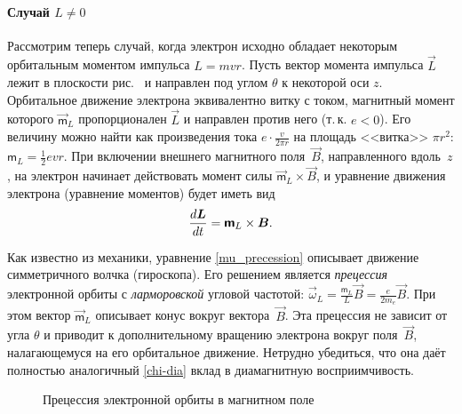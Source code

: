 \paragraph{Случай $L\ne0$}

Рассмотрим теперь случай, когда электрон исходно обладает некоторым
орбитальным моментом импульса $L=mvr$. 
Пусть вектор момента импульса $\vec{L}$ лежит в плоскости
рис.~ и направлен под углом $\theta$ к некоторой оси $z$.
Орбитальное движение электрона эквивалентно витку с током,
магнитный момент которого $\vec{\mathsf{m}}_L$ пропорционален $\vec{L}$
и направлен против него (т.\,к. $e<0$).
Его величину можно найти как произведения тока $e\cdot \frac{v}{2\pi r}$ 
на площадь <<витка>> $\pi r^2$: $\mathsf{m}_L= \frac12 evr$.
При включении внешнего магнитного поля~$\vec{B}$,
направленного вдоль~$z$, на электрон начинает
действовать момент силы $\vec{\mathsf{m}}_L\times \vec{B}$,
и уравнение движения электрона (уравнение моментов) будет иметь вид
\begin{equation}
\eqmark{mu_precession}
	\frac{d\vec{L}}{dt} = \vec{\mathsf{m}}_L\times \vec{B}.
\end{equation}

Как известно из механики, уравнение \eqref{mu_precession} 
описывает движение симметричного волчка (гироскопа). Его решением является
\emph{прецессия} электронной орбиты с \emph{ларморовской} угловой частотой:
$\vec{\omega}_L = \frac{\mathsf{m}_L }{L} \vec{B} = \frac{e}{2m_e}\vec{B}$.
При этом вектор $\vec{\mathsf{m}}_L$ описывает конус вокруг вектора~$\vec{B}$.
Эта прецессия не зависит от угла $\theta$ и приводит к дополнительному 
вращению электрона вокруг поля~$\vec{B}$, налагающемуся на его орбитальное 
движение. Нетрудно убедиться, что она даёт полностью аналогичный 
\eqref{chi-dia} вклад в диамагнитную восприимчивость.

\begin{figure}[h!]
    \centering
    \caption{Прецессия электронной орбиты в магнитном поле}
\end{figure}

